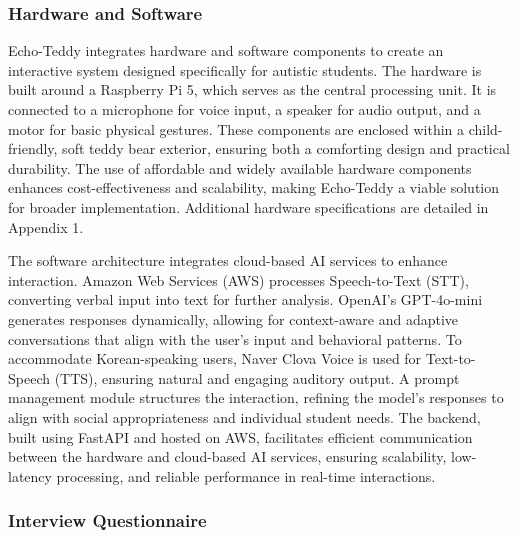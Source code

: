 \subsubsection{Hardware and Software}

Echo-Teddy integrates hardware and software components to create an interactive system designed specifically for autistic students. The hardware is built around a Raspberry Pi 5, which serves as the central processing unit. It is connected to a microphone for voice input, a speaker for audio output, and a motor for basic physical gestures. These components are enclosed within a child-friendly, soft teddy bear exterior, ensuring both a comforting design and practical durability. The use of affordable and widely available hardware components enhances cost-effectiveness and scalability, making Echo-Teddy a viable solution for broader implementation. Additional hardware specifications are detailed in Appendix 1.

The software architecture integrates cloud-based AI services to enhance interaction. Amazon Web Services (AWS) processes Speech-to-Text (STT), converting verbal input into text for further analysis. OpenAI’s GPT-4o-mini generates responses dynamically, allowing for context-aware and adaptive conversations that align with the user’s input and behavioral patterns. To accommodate Korean-speaking users, Naver Clova Voice is used for Text-to-Speech (TTS), ensuring natural and engaging auditory output. A prompt management module structures the interaction, refining the model’s responses to align with social appropriateness and individual student needs. The backend, built using FastAPI and hosted on AWS, facilitates efficient communication between the hardware and cloud-based AI services, ensuring scalability, low-latency processing, and reliable performance in real-time interactions.

\subsubsection{Interview Questionnaire}

